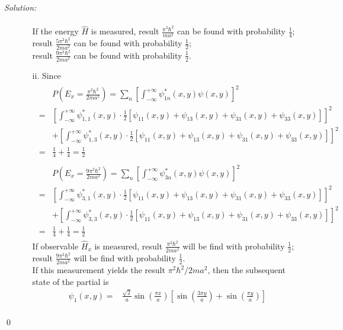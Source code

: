 \documentclass[12pt,a4paper]{article}
\newenvironment{sol}
    {\emph{Solution:}
    }
    {
    \qed
    }
\begin{document}
\begin{sol}
\begin{itemize}
\begin{itemize}
\begin{gather}
\end{gather}\normalsize
If the energy $\hat{H}$ is measured, result $\frac{\pi^2\hbar^2}{ma^2}$ can be found with probability $\frac{1}{4}$;\\
result $\frac{5\pi^2\hbar^2}{2ma^2}$ can be found with probability $\frac{1}{2}$;\\
result $\frac{9\pi^2\hbar^2}{2ma^2}$ can be found with probability $\frac{1}{2}$.
\item[ii.] Since
\begin{gather}
\begin{align}
\nonumber&P\left(E_x=\frac{\pi^2\hbar^2}{2ma^2}\right)=\sum_{n}\left[\int_{-\infty}^{+\infty}\psi_{1n}^*(x,y)\psi(x,y)\right]^2\\
\nonumber=&\left[\int_{-\infty}^{+\infty}\psi_{1,1}^*(x,y)\cdot\frac{1}{2}[\psi_{11}(x,y)+\psi_{13}(x,y)+\psi_{31}(x,y)+\psi_{33}(x,y)]\right]^2\\
\nonumber&+\left[\int_{-\infty}^{+\infty}\psi_{1,3}^*(x,y)\cdot\frac{1}{2}[\psi_{11}(x,y)+\psi_{13}(x,y)+\psi_{31}(x,y)+\psi_{33}(x,y)]\right]^2\\
=&\frac{1}{4}+\frac{1}{4}=\frac{1}{2}
\end{align}\\
\begin{align}
\nonumber&P\left(E_x=\frac{9\pi^2\hbar^2}{2ma^2}\right)=\sum_{n}\left[\int_{-\infty}^{+\infty}\psi_{3n}^*(x,y)\psi(x,y)\right]^2\\
\nonumber=&\left[\int_{-\infty}^{+\infty}\psi_{3,1}^*(x,y)\cdot\frac{1}{2}[\psi_{11}(x,y)+\psi_{13}(x,y)+\psi_{31}(x,y)+\psi_{33}(x,y)]\right]^2\\
\nonumber&+\left[\int_{-\infty}^{+\infty}\psi_{3,3}^*(x,y)\cdot\frac{1}{2}[\psi_{11}(x,y)+\psi_{13}(x,y)+\psi_{31}(x,y)+\psi_{33}(x,y)]\right]^2\\
=&\frac{1}{4}+\frac{1}{4}=\frac{1}{2}
\end{align}
\end{gather}
If observable $\hat{H}_x$ is measured, result $\frac{\pi^2\hbar^2}{2ma^2}$ will be find with probability $\frac{1}{2}$;\\
result $\frac{9\pi^2\hbar^2}{2ma^2}$ will be find with probability $\frac{1}{2}$.\\
If this measurement yields the result $\pi^2\hbar^2/2ma^2$, then the subsequent state of the partial is
\begin{align}
\nonumber\psi_1(x,y)=&\frac{\sqrt{2}}{a}\sin\left(\frac{\pi x}{a}\right)\left[\sin\left(\frac{3\pi y}{a}\right)+\sin\left(\frac{\pi y}{a}\right)\right]\\

\end{align}
\end{itemize}
\end{itemize}
\end{sol}
\end{document}
